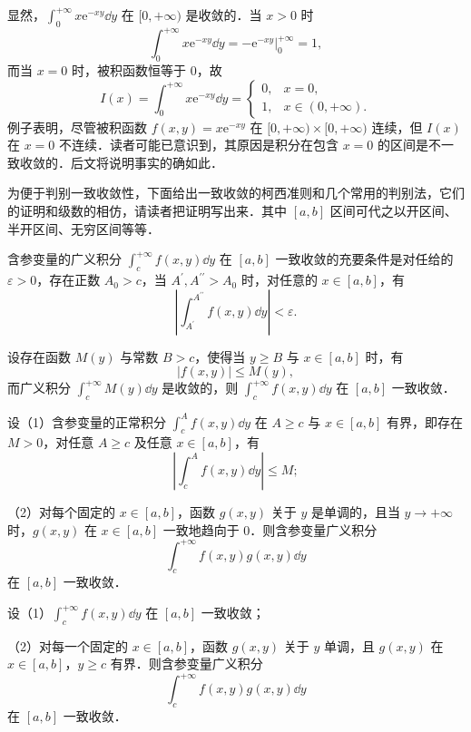 显然，$\displaystyle\int_{0}^{+\infty}x\mathrm{e}^{-xy}\dd y$ 在 $[0,+\infty)$ 是收敛的．当 $x>0$ 时
\[
\int_{0}^{+\infty}x\mathrm{e}^{-xy}\dd y=-\left.\mathrm{e}^{-xy}\right|_{0}^{+\infty}=1,
\]
而当 $x=0$ 时，被积函数恒等于 $0$，故
\[
I(x)=\int_{0}^{+\infty}x\mathrm{e}^{-xy}\dd y=\begin{cases}
0,&x=0,\\
1,&x\in(0,+\infty).
\end{cases}
\]
例子表明，尽管被积函数 $f(x,y)=x\mathrm{e}^{-xy}$ 在 $[0,+\infty)\times[0,+\infty)$ 连续，但 $I(x)$ 在 $x=0$ 不连续．读者可能已意识到，其原因是积分在包含 $x=0$ 的区间是不一致收敛的．后文将说明事实的确如此．

为便于判别一致收敛性，下面给出一致收敛的柯西准则和几个常用的判别法，它们的证明和级数的相仿，请读者把证明写出来．其中 $[a,b]$ 区间可代之以开区间、半开区间、无穷区间等等．

\begin{theorem}[一致收敛的柯西准则]\label{thm:19-7}
含参变量的广义积分 $\displaystyle\int_{c}^{+\infty}f(x,y)\dd y$ 在 $[a,b]$ 一致收敛的充要条件是对任给的 $\varepsilon>0$，存在正数 $A_{0}>c$，当 $A^{\prime},A^{\prime\prime}>A_{0}$ 时，对任意的 $x\in[a,b]$，有
\[
\left|\int_{A^{\prime}}^{A^{\prime\prime}}f(x,y)\dd y\right|<\varepsilon.
\]
\end{theorem}

\begin{theorem}\label{thm:19-8}
设存在函数 $M(y)$ 与常数 $B>c$，使得当 $y\geqslant B$ 与 $x\in[a,b]$ 时，有
\[
|f(x,y)|\leqslant M(y),
\]
而广义积分 $\displaystyle\int_{c}^{+\infty}M(y)\dd y$ 是收敛的，则 $\displaystyle\int_{c}^{+\infty}f(x,y)\dd y$ 在 $[a,b]$ 一致收敛．
\end{theorem}

\begin{theorem}[狄利克雷判别法]\label{thm:19-9}
设（1）含参变量的正常积分 $\displaystyle\int_{c}^{A}f(x,y)\dd y$ 在 $A\geqslant c$ 与 $x\in[a,b]$ 有界，即存在 $M>0$，对任意 $A\geqslant c$ 及任意 $x\in[a,b]$，有
\[
\left|\int_{c}^{A}f(x,y)\dd y\right|\leqslant M;
\]

（2）对每个固定的 $x\in[a,b]$，函数 $g(x,y)$ 关于 $y$ 是单调的，且当 $y\to+\infty$ 时，$g(x,y)$ 在 $x\in[a,b]$ 一致地趋向于 $0$．则含参变量广义积分
\[
\int_{c}^{+\infty}f(x,y)g(x,y)\dd y
\]
在 $[a,b]$ 一致收敛．
\end{theorem}

\begin{theorem}[阿贝尔判别法]\label{thm:19-10}
设（1）$\displaystyle\int_{c}^{+\infty}f(x,y)\dd y$ 在 $[a,b]$ 一致收敛；

（2）对每一个固定的 $x\in[a,b]$，函数 $g(x,y)$ 关于 $y$ 单调，且 $g(x,y)$ 在 $x\in[a,b]$，$y\geqslant c$ 有界．则含参变量广义积分
\[
\int_{c}^{+\infty}f(x,y)g(x,y)\dd y
\]
在 $[a,b]$ 一致收敛．
\end{theorem}

